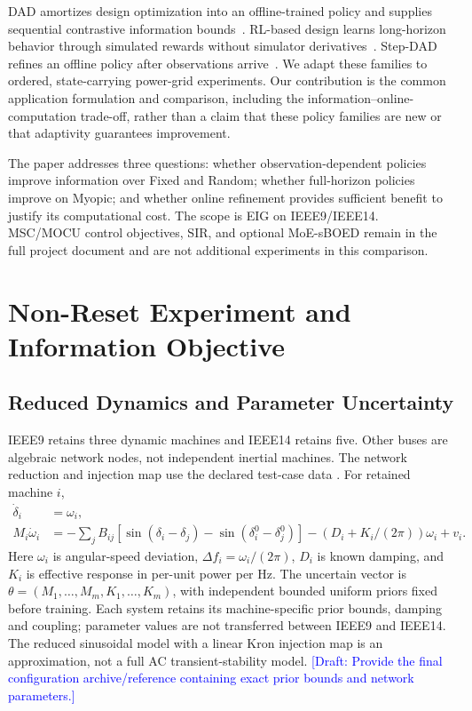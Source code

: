 \documentclass[conference]{IEEEtran}
\newcommand{\draftnote}[1]{\textcolor{blue}{[Draft: #1]}}
\begin{document}
DAD amortizes design optimization into an offline-trained policy and supplies
sequential contrastive information bounds~\cite{foster2021dad}.
RL-based design learns long-horizon behavior through simulated rewards
without simulator derivatives~\cite{blau2022rlsboed}. Step-DAD refines an
offline policy after observations arrive~\cite{hedman2025stepdad}.
We adapt these families to ordered, state-carrying power-grid experiments.
Our contribution is the common application formulation and comparison,
including the information--online-computation trade-off, rather than a claim
that these policy families are new or that adaptivity guarantees improvement.

The paper addresses three questions: whether observation-dependent policies
improve information over Fixed and Random; whether full-horizon policies
improve on Myopic; and whether online refinement provides sufficient benefit
to justify its computational cost. The scope is EIG on IEEE9/IEEE14.
MSC/MOCU control objectives, SIR, and optional MoE-sBOED remain in the full
project document and are not additional experiments in this comparison.

\section{Non-Reset Experiment and Information Objective}
\subsection{Reduced Dynamics and Parameter Uncertainty}
IEEE9 retains three dynamic machines and IEEE14 retains five. Other buses
are algebraic network nodes, not independent inertial machines. The network
reduction and injection map use the declared test-case data
\cite{zimmerman2011matpower}. For retained machine $i$,
\begin{align}
\dot\delta_i &= \omega_i,\\
M_i\dot\omega_i &= -\sum_j B_{ij}
 [\sin(\delta_i-\delta_j)-\sin(\delta_i^0-\delta_j^0)]
 -(D_i+K_i/(2\pi))\omega_i+v_i .
\label{eq:swing}
\end{align}
Here $\omega_i$ is angular-speed deviation, $\Delta f_i=\omega_i/(2\pi)$,
$D_i$ is known damping, and $K_i$ is effective response in per-unit power
per Hz. The uncertain vector is
$\theta=(M_1,\ldots,M_m,K_1,\ldots,K_m)$, with independent bounded uniform
priors fixed before training. Each system retains its machine-specific
prior bounds, damping and coupling; parameter values are not transferred
between IEEE9 and IEEE14. The reduced sinusoidal model with a linear Kron
injection map is an approximation, not a full AC transient-stability model.
\draftnote{Provide the final configuration archive/reference containing exact prior bounds and network parameters.}
\end{document}
